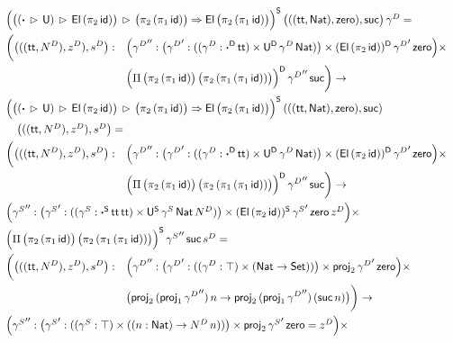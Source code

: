 \documentclass[a4paper,UKenglish,cleveref, autoref]{lipics-v2019}
\begin{document}
\begin{example}
\begin{alignat*}{5}
    & \rlap{$\Big(\big((\boldsymbol{\cdot}\,\ext\,\U)\,\ext\,\El\,(\pi_2\,\id)\big)\,\ext\,\big(\pi_2\,(\pi_1\,\id)\big) \Ra \El\,\big(\pi_2\,(\pi_1\,\id)\big)\Big)^\S\,\big(((\tt,\mathsf{Nat}),\mathsf{zero}),\mathsf{suc}\big)\,\gamma^D = $} \\
    & \bigg(\big(((\tt,N^D),z^D),s^D\big): && \Big( {\gamma^D}'':\big({\gamma^D}':((\gamma^D:\boldsymbol{\cdot}^\D\,\tt)\times \U^\D\,\gamma^D\,\mathsf{Nat})\big)\times (\El\,(\pi_2\,\id))^\D\,{\gamma^D}'\,\mathsf{zero}\Big)\times \\
    & && \Big(\Pi\,\big(\pi_2\,(\pi_1\,\id)\big)\,\big(\pi_2\,(\pi_1\,(\pi_1\,\id))\big)\Big)^\D\,{\gamma^D}''\,\mathsf{suc}\bigg)\ra \\
    & \rlap{$ \Big(\big((\boldsymbol{\cdot}\,\ext\,\U)\,\ext\,\El\,(\pi_2\,\id)\big)\,\ext\,\big(\pi_2\,(\pi_1\,\id)\big) \Ra \El\,\big(\pi_2\,(\pi_1\,\id)\big)\Big)^\S\,(((\tt,\mathsf{Nat}),\mathsf{zero}),\mathsf{suc})\,$} \\
    & \rlap{$\hspace{1em} \big(((\tt,N^D),z^D),s^D\big) =$} \\
    & \bigg(\big(((\tt,N^D),z^D),s^D\big): && \Big( {\gamma^D}'':\big({\gamma^D}':((\gamma^D:\boldsymbol{\cdot}^\D\,\tt)\times \U^\D\,\gamma^D\,\mathsf{Nat})\big)\times (\El\,(\pi_2\,\id))^\D\,{\gamma^D}'\,\mathsf{zero}\Big)\times \\
    & && \Big(\Pi\,\big(\pi_2\,(\pi_1\,\id)\big)\,\big(\pi_2\,(\pi_1\,(\pi_1\,\id))\big)\Big)^\D\,{\gamma^D}''\,\mathsf{suc}\bigg)\ra \\
    & \rlap{$ \Big( {\gamma^S}'':\big({\gamma^S}':((\gamma^S:\boldsymbol{\cdot}^\S\,\tt\,\tt)\times \U^\S\,\gamma^S\,\mathsf{Nat}\,N^D)\big)\times (\El\,(\pi_2\,\id))^\S\,{\gamma^S}'\,\mathsf{zero}\,z^D\Big)\times$} \\
    & \rlap{$ \Big(\Pi\,\big(\pi_2\,(\pi_1\,\id)\big)\,\big(\pi_2\,(\pi_1\,(\pi_1\,\id))\big)\Big)^\S\,{\gamma^S}''\,\mathsf{suc}\,s^D = $} \\
    & \bigg(\big(((\tt,N^D),z^D),s^D\big): && \Big( {\gamma^D}'':\big({\gamma^D}':((\gamma^D:\top)\times (\mathsf{Nat}\ra\Set))\big)\times \proj_2\,{\gamma^D}'\,\mathsf{zero}\Big)\times \\
    & && \big(\proj_2\,(\proj_1\,{\gamma^D}'')\,n\ra\proj_2\,(\proj_1\,{\gamma^D}'')\,(\mathsf{suc}\,n)\big)\bigg)\ra \\
    & \rlap{$ \Big( {\gamma^S}'':\big({\gamma^S}':((\gamma^S:\top)\times ((n:\mathsf{Nat})\ra N^D\,n))\big)\times \proj_2\,{\gamma^S}'\,\mathsf{zero} = z^D\Big)\times$} \\

\end{alignat*}
\end{example}
\end{document}
